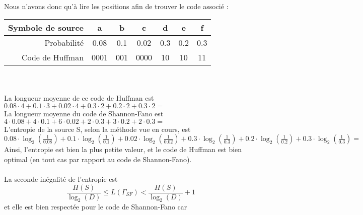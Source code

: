 \documentclass[10pt,a4paper]{article}
\begin{document}
\begin{enumerate}
\begin{center}
\\
\end{center}
Nous n'avons donc qu'à lire les positions afin de trouver le code associé :
\begin{tabular}{r|c|c|c|c|c|c}
	Symbole de source & a & b & c & d & e & f\\
		\hline
	Probabilité& 0.08 & 0.1 & 0.02 & 0.3 & 0.2 & 0.3\\
		\hline
	Code de Huffman& 0001 & 001 & 0000 & 10 & 10 & 11
\end{tabular}\\
\\
La longueur moyenne de ce code de Huffman est \\
$0.08\cdot 4 + 0.1 \cdot 3 + 0.02 \cdot 4 + 0.3 \cdot 2 + 0.2 \cdot 2 + 0.3 \cdot 2 =$ \\
La longueur moyenne du code de Shannon-Fano est \\
$4\cdot 0.08 + 4\cdot 0.1 + 6\cdot 0.02 + 2\cdot 0.	3 + 3\cdot 0.2 + 2\cdot 0.3 =$ \\
L'entropie de la source S, selon la méthode vue en cours, est\\
$0.08\cdot\log_2\left(\frac{1}{0.08}\right) + 0.1\cdot\log_2\left(\frac{1}{0.1}\right) + 0.02\cdot\log_2\left(\frac{1}{0.02}\right) + 0.3\cdot\log_2\left(\frac{1}{0.3}\right) + 0.2\cdot\log_2\left(\frac{1}{0.2}\right) + 0.3\cdot\log_2\left(\frac{1}{0.3}\right) =$ \\
Ainsi, l'entropie est bien la plus petite valeur, et le code de Huffman est bien optimal (en tout cas par rapport au code de Shannon-Fano).\\
\\
La seconde inégalité de l'entropie est 
\begin{equation*}
	\frac{H(S)}{\log_2(D)} \leq L(\Gamma_{SF}) < \frac{H(S)}{\log_2(D)} +1
\end{equation*}
et elle est bien respectée pour le code de Shannon-Fano car
\begin{align*}

\end{align*}
\end{enumerate}
\end{document}
